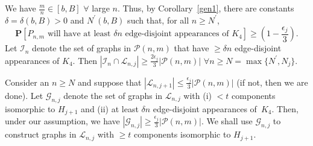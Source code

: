 \documentclass{article}
\newtheorem{Proof of Theorem}{Proof of Theorem}
\begin{document}
We have $\frac{m}{n} \in [b,B]$ $\forall$ large $n$.
Thus, by Corollary~\ref{gen1}, 
there are constants $\delta = \delta(b,B) >0$ and $N^{\prime}(b,B)$ such that, for all $n \geq N^{\prime}$,
\begin{displaymath}
\mathbf{P}[P_{n,m} \textrm{ will have at least $\delta n$ edge-disjoint appearances of } K_{4}] 
\geq \left(1- \frac{\epsilon_{j}}{3} \right).
\end{displaymath}
Let $\mathcal{I}_{n}$ denote the set of graphs in $\mathcal{P}(n,m)$ 
that have $\geq \delta n$ edge-disjoint appearances of $K_{4}$.
Then $|\mathcal{I}_{n} \cap \mathcal{L}_{n,j}| \geq 
\frac{2 \epsilon_{j}}{3} |\mathcal{P}(n,m)|$ $\forall n \geq N = \max \{N^{\prime}, N_{j} \}$. 

Consider an $n \geq N$ and suppose that 
$|\mathcal{L}_{n,j+1}| \leq \frac{\epsilon_{j}}{3} |\mathcal{P}(n,m)|$
(if not, then we are done).
Let $\mathcal{G}_{n,j}$ denote the set of graphs in $\mathcal{L}_{n,j}$ 
with (i) $<t$ components isomorphic to $H_{j+1}$ 
and (ii) at least $\delta n$ edge-disjoint appearances of~$K_{4}$.
Then, under our assumption,
we have $|\mathcal{G}_{n,j}| \geq \frac{\epsilon_{j}}{3} |\mathcal{P}(n,m)|$.
We shall use $\mathcal{G}_{n,j}$ to construct graphs in $\mathcal{L}_{n,j}$
with $\geq t$ components isomorphic to $H_{j+1}$. \\
\end{document}
